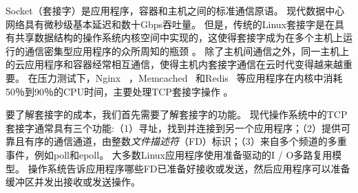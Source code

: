 \iffalse
\begin{figure}
\begin{lstlisting}[style=CStyle]
int lfd = socket(...); // listen file descriptor (fd)
bind(lfd, listen_addr_and_port, ...);
listen(lfd, BACKLOG);
fcntl(lfd, F_SETFL, fcntl(lfd,F_GETFL,0) | O_NONBLOCK);
int efd = epoll_create(MAXEVENTS); // event fd
epoll_ctl(efd, EPOLL_CTL_ADD, lfd, ...);
while (true) { // main event loop
	int n = epoll_wait(efd, events, MAXEVENTS, 0);
	for (int i=0; i<n; i++) { // iterate events
		if (events[i].data.fd == lfd) { // new connection
			int cfd = accept(sfd, ...); // connection fd
			epoll_ctl(efd, EPOLL_CTL_ADD, cfd, ...);
			fcntl(cfd,F_SETFL,fcntl(cfd,F_GETFL,0)|O_NONBLOCK);
		}
		else if (events[i].events & EPOLLIN){//ready to recv
			do { // fetch all received data
				cnt = recv(events[i].data.fd, recvbuf, buflen);
				recvbuf = next_recv_buf();
			} while (cnt > 0);
			// do processing
		}
		else if (events[i].events & EPOLLOUT){//ready to send
			do { // flush send buf
				cnt = send(events[i].data.fd, sendbuf, sendlen);
				sendbuf += cnt; sendlen -= cnt;
			} while (cnt > 0 && sendlen > 0);
		}
	}
}
\end{lstlisting}

\caption{Pseudo-code of a typical socket server application, showing most important socket operations. A socket connection is a FIFO byte-stream channel identified by an integer \emph{file descriptor} (FD). Linux enables a readiness-driven I/O multiplexing model, in which the OS tells application which FDs are ready to receive or send, then the application may prepare buffers and issue socket operations.}
\label{socksdirect:fig:socket-pseudo-code}

\end{figure}
\fi


Socket（套接字）是应用程序，容器和主机之间的标准通信原语。
现代数据中心网络具有微秒级基本延迟和数十Gbps吞吐量。 但是，传统的Linux套接字是在具有共享数据结构的操作系统内核空间中实现的，这使得套接字成为在多个主机上运行的通信密集型应用程序的众所周知的瓶颈 \cite {barroso2017attack}。 除了主机间通信之外，同一主机上的云应用程序和容器经常相互通信，使得主机内套接字通信在云时代变得越来越重要。 在压力测试下，Nginx~ \cite {reese2008nginx}，Memcached~ \cite {fitzpatrick2004distributed}和Redis~ \cite {carlson2013redis}等应用程序在内核中消耗50％到90％的CPU时间，主要处理TCP套接字操作 \cite{jeong2014mtcp}。

要了解套接字的成本，我们首先需要了解套接字的功能。
现代操作系统中的TCP套接字通常具有三个功能:（1）寻址，找到并连接到另一个应用程序；（2）提供可靠且有序的通信通道，由整数\emph {文件描述符}（FD）标识；（3）来自多个频道的多重事件，例如poll和epoll。 大多数Linux应用程序使用准备驱动的I / O多路复用模型。 操作系统告诉应用程序哪些FD已准备好接收或发送，然后应用程序可以准备缓冲区并发出接收或发送操作。


